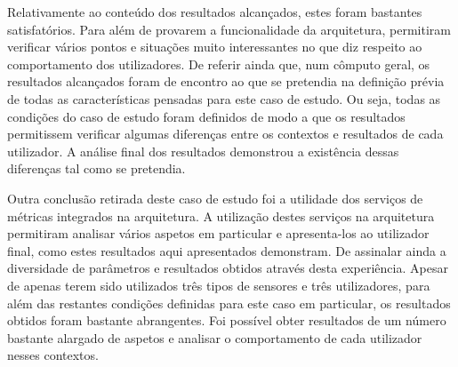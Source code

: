 Relativamente ao conteúdo dos resultados alcançados, estes foram bastantes satisfatórios. Para além de provarem a funcionalidade da arquitetura, permitiram verificar vários pontos e situações muito interessantes no que diz respeito ao comportamento dos utilizadores. De referir ainda que, num cômputo geral, os resultados alcançados foram de encontro ao que se pretendia na definição prévia de todas as características pensadas para este caso de estudo. Ou seja, todas as condições do caso de estudo foram definidos de modo a que os resultados permitissem verificar algumas diferenças entre os contextos e resultados de cada utilizador. A análise final dos resultados demonstrou a existência dessas diferenças tal como se pretendia.

Outra conclusão retirada deste caso de estudo foi a utilidade dos serviços de métricas integrados na arquitetura. A utilização destes serviços na arquitetura permitiram analisar vários aspetos em particular e apresenta-los ao utilizador final, como estes resultados aqui apresentados demonstram. De assinalar ainda a diversidade de parâmetros e resultados obtidos através desta experiência. Apesar de apenas terem sido utilizados três tipos de sensores e três utilizadores, para além das restantes condições definidas para este caso em particular, os resultados obtidos foram bastante abrangentes. Foi possível obter resultados de um número bastante alargado de aspetos e analisar o comportamento de cada utilizador nesses contextos.